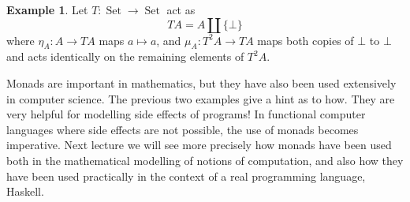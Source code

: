 \documentclass[12pt]{article}
\theoremstyle{plain}
\theoremstyle{definition}
\newtheorem{example}[thm]{Example}
\newcommand{\lto}{\longrightarrow}
\begin{document}
\begin{example}
	Let $T: \operatorname{Set} \lto \operatorname{Set}$ act as
	\begin{equation}
		TA = A \coprod \{ \bot \}
		\end{equation}
	where $\eta_A: A \lto TA$ maps $a \longmapsto a$, and $\mu_A: T^2A \lto TA$ maps both copies of $\bot$ to $\bot$ and acts identically on the remaining elements of $T^2A$.
	\end{example}

Monads are important in mathematics, but they have also been used extensively in computer science. The previous two examples give a hint as to how. They are very helpful for modelling side effects of programs! In functional computer languages where side effects are not possible, the use of monads becomes imperative. Next lecture we will see more precisely how monads have been used both in the mathematical modelling of notions of computation, and also how they have been used practically in the context of a real programming language, Haskell.
\end{document}
